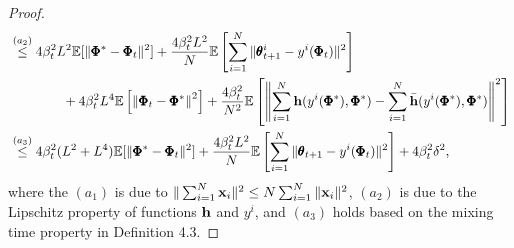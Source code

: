 \documentclass{article} %
\theoremstyle{plain}
\theoremstyle{definition}
\theoremstyle{remark}
\begin{document}
{\begin{proof}
\begin{align*}
    & \overset{(a_2)}{\leq} 4\beta_t^2L^2\mathbb{E}[\|\pmb{\Phi}^*-\pmb{\Phi}_t\|^2]+\frac{4\beta_t^2L^2}{N}\mathbb{E}\left[\sum_{i=1}^N\|\pmb{\theta}_{t+1}^i-y^i(\pmb{\Phi}_t)\|^2\right]\allowdisplaybreaks\\
    &\qquad\qquad+{4\beta_t^2L^4}\mathbb{E}\left[\left\|\pmb{\Phi}_t- \pmb{\Phi}^*\right\|^2\right]+\frac{4\beta_t^2}{N^2}\mathbb{E}\left[\left\|\sum_{i=1}^N\bh(y^i(\pmb{\Phi}^{*}), \pmb{\Phi}^*)-\sum_{i=1}^N\bar{\bh}(y^i(\pmb{\Phi}^{*}), \pmb{\Phi}^*)\right\|^2\right]\\
   & \overset{(a_3)}{\leq}4\beta_t^2(L^2+L^4)\mathbb{E}[\|\pmb{\Phi}^*-\pmb{\Phi}_t\|^2]+\frac{4\beta_t^2L^2}{N}\mathbb{E}\left[\sum_{i=1}^N\|\pmb{\theta}_{t+1}-y^i(\pmb{\Phi}_t)\|^2\right]+4\beta_t^2\delta^2,
\end{align*}
where the $(a_1)$ is due to $\|\sum_{i=1}^N {\mathbf{x}}_i\|^2\leq N\sum_{i=1}^N\|{\mathbf{x}}_i\|^2$, $(a_2)$ is due to the Lipschitz property of functions $\mathbf{h}$ and $y^i$, and $(a_3)$ holds based on the mixing time property in Definition 4.3.


\end{proof}

}
\end{document}
